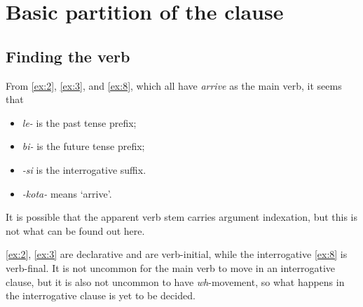 \documentclass{article}
\newcommand*{\term}[1]{\emph{#1}}
\newcommand*{\corpus}[1]{\emph{#1}}
\begin{document}
\section{Basic partition of the clause}

\subsection{Finding the verb}

From \eqref{ex:2}, \eqref{ex:3}, and \eqref{ex:8}, which all have \corpus{arrive} as the main verb,
it seems that 
\begin{itemize}
    \item \corpus{le-} is the past tense prefix;
    \item \corpus{bi-} is the future tense prefix;
    \item \corpus{-si} is the interrogative suffix.
    \item \corpus{-kota-} means `arrive'.
\end{itemize}
It is possible that the apparent verb stem carries argument indexation,
but this is not what can be found out here.

\eqref{ex:2}, \eqref{ex:3} are declarative and are verb-initial,
while the interrogative \eqref{ex:8} is verb-final.
It is not uncommon for the main verb to move in an interrogative clause,
but it is also not uncommon to have \term{wh}-movement,
so what happens in the interrogative clause is yet to be decided.
\end{document}

